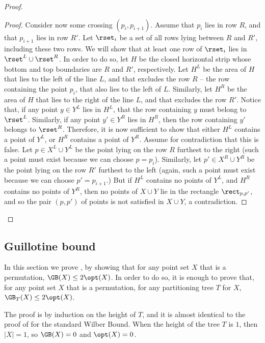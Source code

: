 \begin{proof}{}
\begin{proof}{}
Consider now some crossing $(p_i,p_{i+1})$. Assume that $p_i$ lies in row $R$, and that $p_{i+1}$ lies in row $R'$. Let $\rset_i$ be a set of all rows lying between $R$ and $R'$, including these two rows. We will show that at least one row of $\rset_i$ lies in $\rset^L\cup \rset^R$. In order to do so, let $H$ be the closed horizontal strip whose bottom and top boundaries are $R$ and $R'$, respectively. Let $H^L$ be the area of $H$ that lies to the left of the line $L$, and that excludes the row $R$ -- the row containing the point $p_i$, that also lies to the left of $L$. Similarly, let $H^R$ be the area of $H$ that lies to the right of the line $L$, and that excludes the row $R'$. Notice that, if any point $y\in Y^L$ lies in $H^L$, that the row containing $y$  must belong to $\rset^L$. Similarly, if any point $y'\in Y^R$ lies in $H^R$, then the row containing $y'$ belongs to $\rset^R$. Therefore, it is now sufficient to show that either $H^L$ contains a point of $Y^L$, or $H^R$ contains a point of $Y^R$. Assume for contradiction that this is false. Let $p\in X^L\cup Y^L$ be the point lying on the row $R$ furthest to the right (such a point must exist because we can choose $p=p_i$). Similarly, let $p'\in X^R\cup Y^R$ be the point lying on the row $R'$ furthest to the left (again, such a point must exist because we can choose $p'=p_{i+1}$.) But if $H^L$ contains no points of $Y^L$, and $H^R$ contains no points of $Y^R$, then no points of $X\cup Y$ lie in the rectangle $\rect_{p,p'}$, and so the pair $(p,p')$ of points is not satisfied in $X\cup Y$, a contradiction.
\end{proof}	
\end{proof}

\subsection{Guillotine bound}
\label{sec: GB proof} 

In this section we prove , by showing that for any point set $X$ that is a permutation, $\GB(X)\leq 2\opt(X)$. In order to do so, it is enough to prove that, for any point set $X$ that is a permutation, for any partitioning tree $T$ for $X$, $\GB_T(X) \leq 2\opt(X)$. 

The proof is by induction on the height of $T$, and it is almost identical to the proof of  for the standard Wilber Bound. When the height of the tree $T$ is $1$, then $|X|=1$, so $\GB(X)=0$ and $\opt(X)=0$.

